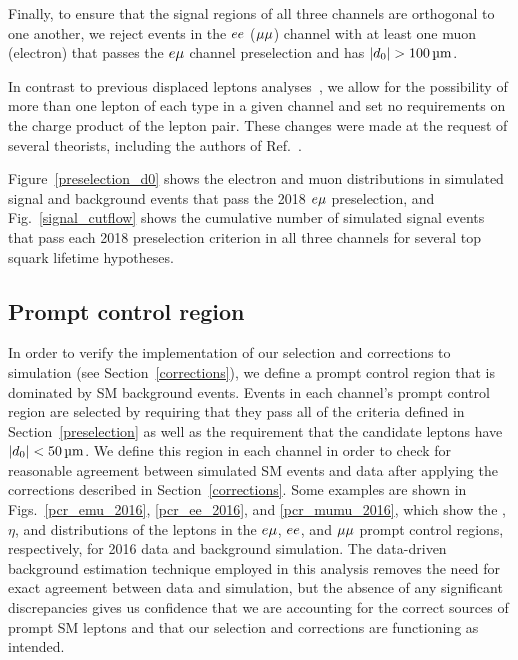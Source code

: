 Finally, to ensure that the signal regions of all three channels are orthogonal to one another, we reject events in the $ee$ (${\mu}{\mu}$) channel with at least one muon (electron) that passes the $e{\mu}$ channel preselection and has $\ad>\SI{100}{\um}$.

In contrast to previous displaced leptons analyses~\cite{displaced_leptons_run1, displaced_leptons_bing}, we allow for the possibility of more than one lepton of each type in a given channel and set no requirements on the charge product of the lepton pair. These changes were made at the request of several theorists, including the authors of Ref.~\cite{Evans:2016zau}.

Figure~\ref{preselection_d0} shows the electron and muon \ad distributions in simulated signal and background events that pass the 2018 $e{\mu}$ preselection, and Fig.~\ref{signal_cutflow} shows the cumulative number of simulated signal events that pass each 2018 preselection criterion in all three channels for several top squark lifetime hypotheses.




\subsection{Prompt control region}
\label{pcr}
In order to verify the implementation of our selection and corrections to simulation (see Section~\ref{corrections}), we define a prompt control region that is dominated by SM background events. Events in each channel's prompt control region are selected by requiring that they pass all of the criteria defined in Section~\ref{preselection} as well as the requirement that the candidate leptons have $\ad<\SI{50}{\um}$. We define this region in each channel in order to check for reasonable agreement between simulated SM events and data after applying the corrections described in Section~\ref{corrections}. Some examples are shown in Figs.~\ref{pcr_emu_2016}, \ref{pcr_ee_2016}, and \ref{pcr_mumu_2016}, which show the \pt, $\eta$, and \ad distributions of the leptons in the $e{\mu}$, $ee$, and ${\mu}{\mu}$ prompt control regions, respectively, for 2016 data and background simulation. The data-driven background estimation technique employed in this analysis removes the need for exact agreement between data and simulation, but the absence of any significant discrepancies gives us confidence that we are accounting for the correct sources of prompt SM leptons and that our selection and corrections are functioning as intended.

